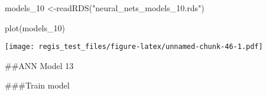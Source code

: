 \documentclass[
]{article}
\newenvironment{Shaded}{\begin{snugshade}}{\end{snugshade}}
\newcommand{\FunctionTok}[1]{\textcolor[rgb]{0.00,0.00,0.00}{#1}}
\newcommand{\NormalTok}[1]{#1}
\newcommand{\OtherTok}[1]{\textcolor[rgb]{0.56,0.35,0.01}{#1}}
\newcommand{\StringTok}[1]{\textcolor[rgb]{0.31,0.60,0.02}{#1}}
\begin{document}
\begin{Shaded}
\begin{Highlighting}[]
\NormalTok{models\_10 }\OtherTok{\textless{}{-}}\FunctionTok{readRDS}\NormalTok{(}\StringTok{"neural\_nets\_models\_10.rds"}\NormalTok{)}
\end{Highlighting}
\end{Shaded}

\begin{Shaded}
\begin{Highlighting}[]
\FunctionTok{plot}\NormalTok{(models\_10)}
\end{Highlighting}
\end{Shaded}

\texttt{[image: regis\_test\_files/figure-latex/unnamed-chunk-46-1.pdf]}

\#\#ANN Model 13

\#\#\#Train model
\end{document}
